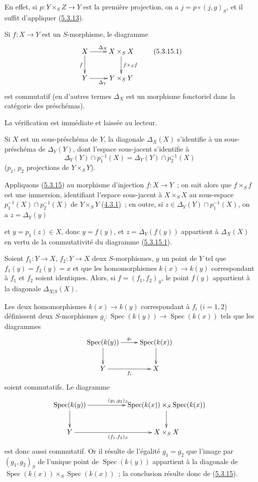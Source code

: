 En effet, si $p:Y\times_S Z\to Y$ est la première projection, on a
$j=p\circ(j,g)_S$, et il suffit d'appliquer
(\hyperref[I.5.3.13-fr]{5.3.13}).

\begin{proposition}[5.3.15]
\label{I.5.3.15-fr}
Si $f:X\to Y$ est un $S$-morphisme, le diagramme
\[
  \xymatrix{
    X\ar[r]^{\Delta_X}\ar[d]_f &
    X\times_S X\ar[d]^{f\times_S f}\\
    Y\ar[r]_{\Delta_Y} &
    Y\times_S Y
  }
  \tag{5.3.15.1}\label{I.5.3.15.1-fr}
\]
est commutatif (en d'autres termes $\Delta_X$ est un morphisme fonctoriel
dans la catégorie des préschémas).
\end{proposition}

La vérification est immédiate et laissée au lecteur.

\begin{corollary}[5.3.16]
\label{I.5.3.16-fr}
Si $X$ est un sous-préschéma de $Y$, la diagonale $\Delta_X(X)$ s'identifie à
un sous-préschéma de $\Delta_Y(Y)$, dont l'espace sous-jacent s'identifie à
\[
  \Delta_Y(Y)\cap p_1^{-1}(X)=\Delta_Y(Y)\cap p_2^{-1}(X)
\]
($p_1$, $p_2$ projections de $Y\times_S Y$).
\end{corollary}

Appliquons (\hyperref[I.5.3.15-fr]{5.3.15}) au morphisme d'injection
$f:X\to Y$~; on sait alors que $f\times_S f$ est une immersion, identifiant
l'espace sous-jacent à $X\times_S X$ au sous-espace
$p_1^{-1}(X)\cap p_2^{-1}(X)$ de $Y\times_S Y$
(\hyperref[I.4.3.1-fr]{4.3.1})~; en outre, si
$z\in\Delta_Y(Y)\cap p_1^{-1}(X)$, on a $z=\Delta_Y(y)$

et $y=p_1(z)\in X$, donc $y=f(y)$, et $z=\Delta_Y(f(y))$ appartient à
$\Delta_X(X)$ en vertu de la commutativité du diagramme
(\hyperref[I.5.3.15.1-fr]{5.3.15.1}).

\begin{corollary}[5.3.17]
\label{I.5.3.17-fr}
Soient $f_1:Y\to X$, $f_2:Y\to X$ deux $S$-morphismes, $y$ un point de $Y$
tel que $f_1(y)=f_2(y)=x$ et que les homomorphismes $k(x)\to k(y)$
correspondant à $f_1$ et $f_2$ soient identiques. Alors, si
$f=(f_1,f_2)_S$, le point $f(y)$ appartient à la diagonale
$\Delta_{X|S}(X)$.
\end{corollary}

Les deux homomorphismes $k(x)\to k(y)$ correspondant à $f_i$ ($i=1,2$)
définissent deux $S$-morphismes
$g_i:\operatorname{Spec}(k(y))\to\operatorname{Spec}(k(x))$ tels que les
diagrammes
\[
  \xymatrix{
    \operatorname{Spec}(k(y))\ar[r]^{g_i}\ar[d] &
    \operatorname{Spec}(k(x))\ar[d]\\
    Y\ar[r]_{f_i} & X
  }
\]
soient commutatifs. Le diagramme
\[
  \xymatrix{
    \operatorname{Spec}(k(y))\ar[rr]^{(g_1,g_2)_S}\ar[d] & &
    \operatorname{Spec}(k(x))\times_S\operatorname{Spec}(k(x))\ar[d]\\
    Y\ar[rr]_{(f_1,f_2)_S} & & X\times_S X
  }
\]
est donc aussi commutatif. Or il résulte de l'égalité $g_1=g_2$ que l'image
par $(g_1,g_2)_S$ de l'unique point de $\operatorname{Spec}(k(y))$
appartient à la diagonale de
$\operatorname{Spec}(k(x))\times_S\operatorname{Spec}(k(x))$~; la conclusion
résulte donc de (\hyperref[I.5.3.15-fr]{5.3.15}).

